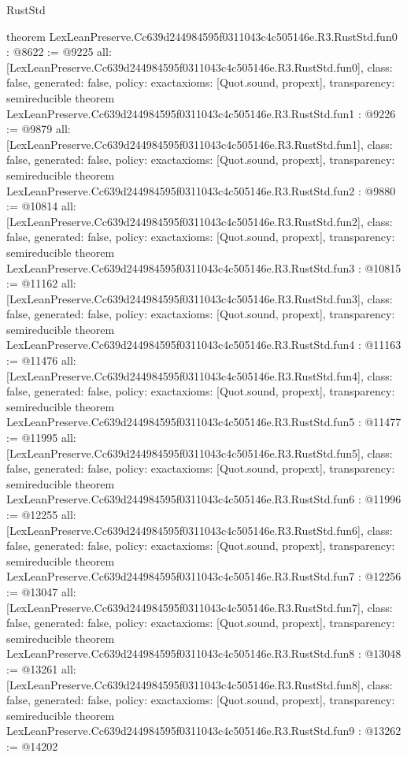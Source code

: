 \begin{lexlean}{RustStd}
\begin{coremodule}
{}
theorem LexLeanPreserve.Cc639d244984595f0311043c4c505146e.R3.RustStd.fun0 : @8622 := @9225 {
  all: [LexLeanPreserve.Cc639d244984595f0311043c4c505146e.R3.RustStd.fun0],
  class: false,
  generated: false,
  policy: exact{axioms: [Quot.sound, propext]},
  transparency: semireducible
}
theorem LexLeanPreserve.Cc639d244984595f0311043c4c505146e.R3.RustStd.fun1 : @9226 := @9879 {
  all: [LexLeanPreserve.Cc639d244984595f0311043c4c505146e.R3.RustStd.fun1],
  class: false,
  generated: false,
  policy: exact{axioms: [Quot.sound, propext]},
  transparency: semireducible
}
theorem LexLeanPreserve.Cc639d244984595f0311043c4c505146e.R3.RustStd.fun2 : @9880 := @10814 {
  all: [LexLeanPreserve.Cc639d244984595f0311043c4c505146e.R3.RustStd.fun2],
  class: false,
  generated: false,
  policy: exact{axioms: [Quot.sound, propext]},
  transparency: semireducible
}
theorem LexLeanPreserve.Cc639d244984595f0311043c4c505146e.R3.RustStd.fun3 : @10815 := @11162 {
  all: [LexLeanPreserve.Cc639d244984595f0311043c4c505146e.R3.RustStd.fun3],
  class: false,
  generated: false,
  policy: exact{axioms: [Quot.sound, propext]},
  transparency: semireducible
}
theorem LexLeanPreserve.Cc639d244984595f0311043c4c505146e.R3.RustStd.fun4 : @11163 := @11476 {
  all: [LexLeanPreserve.Cc639d244984595f0311043c4c505146e.R3.RustStd.fun4],
  class: false,
  generated: false,
  policy: exact{axioms: [Quot.sound, propext]},
  transparency: semireducible
}
theorem LexLeanPreserve.Cc639d244984595f0311043c4c505146e.R3.RustStd.fun5 : @11477 := @11995 {
  all: [LexLeanPreserve.Cc639d244984595f0311043c4c505146e.R3.RustStd.fun5],
  class: false,
  generated: false,
  policy: exact{axioms: [Quot.sound, propext]},
  transparency: semireducible
}
theorem LexLeanPreserve.Cc639d244984595f0311043c4c505146e.R3.RustStd.fun6 : @11996 := @12255 {
  all: [LexLeanPreserve.Cc639d244984595f0311043c4c505146e.R3.RustStd.fun6],
  class: false,
  generated: false,
  policy: exact{axioms: [Quot.sound, propext]},
  transparency: semireducible
}
theorem LexLeanPreserve.Cc639d244984595f0311043c4c505146e.R3.RustStd.fun7 : @12256 := @13047 {
  all: [LexLeanPreserve.Cc639d244984595f0311043c4c505146e.R3.RustStd.fun7],
  class: false,
  generated: false,
  policy: exact{axioms: [Quot.sound, propext]},
  transparency: semireducible
}
theorem LexLeanPreserve.Cc639d244984595f0311043c4c505146e.R3.RustStd.fun8 : @13048 := @13261 {
  all: [LexLeanPreserve.Cc639d244984595f0311043c4c505146e.R3.RustStd.fun8],
  class: false,
  generated: false,
  policy: exact{axioms: [Quot.sound, propext]},
  transparency: semireducible
}
theorem LexLeanPreserve.Cc639d244984595f0311043c4c505146e.R3.RustStd.fun9 : @13262 := @14202 {
}
\end{coremodule}
\end{lexlean}
